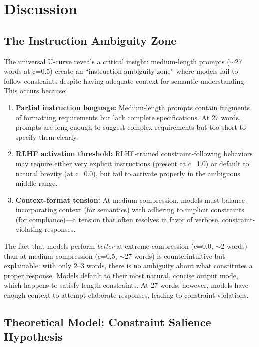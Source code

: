 \documentclass[11pt]{article}
\begin{document}
\section{Discussion}

\subsection{The Instruction Ambiguity Zone}

The universal U-curve reveals a critical insight: medium-length prompts ($\sim$27 words at c=0.5) create an ``instruction ambiguity zone'' where models fail to follow constraints despite having adequate context for semantic understanding. This occurs because:

\begin{enumerate}
\item \textbf{Partial instruction language:} Medium-length prompts contain fragments of formatting requirements but lack complete specifications. At 27 words, prompts are long enough to suggest complex requirements but too short to specify them clearly.
\item \textbf{RLHF activation threshold:} RLHF-trained constraint-following behaviors may require either very explicit instructions (present at c=1.0) or default to natural brevity (at c=0.0), but fail to activate properly in the ambiguous middle range.
\item \textbf{Context-format tension:} At medium compression, models must balance incorporating context (for semantics) with adhering to implicit constraints (for compliance)---a tension that often resolves in favor of verbose, constraint-violating responses.
\end{enumerate}

The fact that models perform \textit{better} at extreme compression (c=0.0, $\sim$2 words) than at medium compression (c=0.5, $\sim$27 words) is counterintuitive but explainable: with only 2--3 words, there is no ambiguity about what constitutes a proper response. Models default to their most natural, concise output mode, which happens to satisfy length constraints. At 27 words, however, models have enough context to attempt elaborate responses, leading to constraint violations.

\subsection{Theoretical Model: Constraint Salience Hypothesis}
\end{document}
